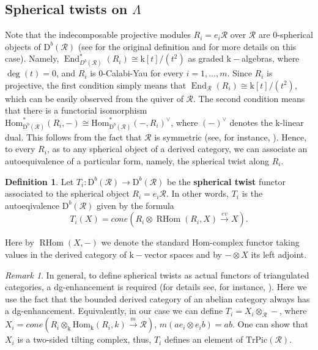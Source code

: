\documentclass[12pt]{amsart}
\theoremstyle{plain}
\theoremstyle{remark}
\newtheorem*{remark}{Remark}
\theoremstyle{definition}
\newtheorem{definition}{Definition}[section]
\newcommand{\End}{\mathop{\mathrm{End}}\nolimits}
\newcommand{\Hom}{{\mathrm{Hom}}}
\newcommand{\RHom}{\mathop{\mathrm{RHom}}\nolimits}
\newcommand{\TrPic}{{\mathrm{TrPic}}}
\newcommand{\D}{{\mathrm{D}}}
\def\kk{\mathrm{k}}
\begin{document}
\subsection{Spherical twists on \texorpdfstring{$\Lambda$}{Lg}} 
Note that the indecomposable projective modules $R_i = e_i\mathcal{R}$ over $\mathcal{R}$ are 0-spherical objects of $\D^b(\mathcal{R})$ (see \cite{ST} for the original definition and \cite{NV} for more details on this case). Namely, $\End^*_{D^b(\mathcal{R})}(R_i) \cong \kk[t]/(t^2)$ as graded $\kk-$algebras, where $\deg(t) = 0$, and $R_i$ is 0-Calabi-Yau for every $i=1,\dots,m$. Since $R_i$ is projective, the first condition simply means that $\End_{\mathcal{R}}(R_i) \cong \kk[t]/(t^2)$, which can be easily observed from the quiver of $\mathcal{R}$. The second condition means that there is a functorial isomorphism ${\Hom_{\D^b(\mathcal{R})}^*(R_i, -) \cong \Hom^*_{\D^b(\mathcal{R})}(-,R_i)^\vee}$, where $(-)^\vee$ denotes the $\kk$-linear dual. This follows from the fact that $\mathcal{R}$ is symmetric (see, for instance, \cite{R3}). Hence, to every $R_i$, as to any spherical object of a derived category, we can associate an autoequivalence of a particular form, namely, the spherical twist along $R_i$. 


\begin{definition} Let $T_i \colon \D^b(\mathcal{R}) \to \D^b(\mathcal{R})$ be the {\bf spherical twist} functor associated to the spherical object $R_i = e_i\mathcal{R}$. In other words, $T_i$ is the autoeqivalence $\D^b(\mathcal{R})$ given by the formula 
$$T_i(X) = cone(R_i \otimes \RHom(R_i,X) \xrightarrow{ev} X).$$ 

 Here by $\RHom(X,-)$ we denote the standard Hom-complex functor taking values in the derived category of $\kk-$vector spaces and by $- \otimes X$ its left adjoint. 

\end{definition}

\begin{remark}
  In general, to define spherical twists as actual functors of triangulated categories, a dg-enhancement \cite{BK} is required (for details see, for instance, \cite{AL}). Here we use the fact that the bounded derived category of an abelian category always has a dg-enhancement.  
Equivalently, in our case we can define $T_i = X_i \otimes_{\mathcal{R}} -$, where $X_i = cone (R_i \otimes_{\kk} \Hom_\kk(R_i,k) \xrightarrow{m} \mathcal{R})$, ${m(ae_i\otimes e_ib) = ab}$. One can show that $X_i$ is a two-sided tilting complex, thus, $T_i$ defines an element of $\TrPic(\mathcal{R})$. 
\end{remark}
\end{document}
